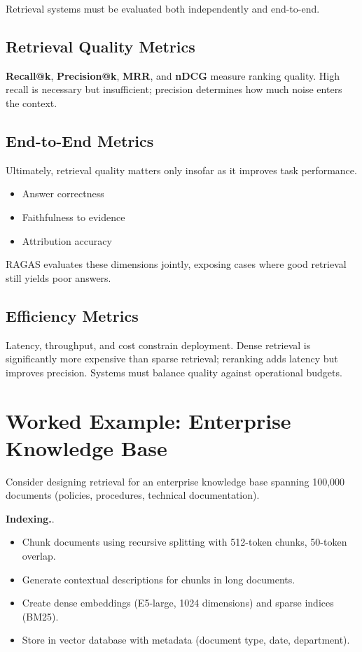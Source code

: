 Retrieval systems must be evaluated both independently and end-to-end.

\subsection{Retrieval Quality Metrics}

\textbf{Recall@k}, \textbf{Precision@k}, \textbf{MRR}, and \textbf{nDCG} measure ranking quality. High recall is necessary but insufficient; precision determines how much noise enters the context.

\subsection{End-to-End Metrics}

Ultimately, retrieval quality matters only insofar as it improves task performance.
\begin{itemize}
\item Answer correctness
\item Faithfulness to evidence
\item Attribution accuracy
\end{itemize}

RAGAS \cite{ragas} evaluates these dimensions jointly, exposing cases where good retrieval still yields poor answers.

\subsection{Efficiency Metrics}

Latency, throughput, and cost constrain deployment. Dense retrieval is significantly more expensive than sparse retrieval; reranking adds latency but improves precision. Systems must balance quality against operational budgets.


\section{Worked Example: Enterprise Knowledge Base}

Consider designing retrieval for an enterprise knowledge base spanning 100,000 documents (policies, procedures, technical documentation).

\textbf{Indexing.}.
\begin{itemize}
\item Chunk documents using recursive splitting with 512-token chunks, 50-token overlap.
\item Generate contextual descriptions for chunks in long documents.
\item Create dense embeddings (E5-large, 1024 dimensions) and sparse indices (BM25).
\item Store in vector database with metadata (document type, date, department).
\end{itemize}

